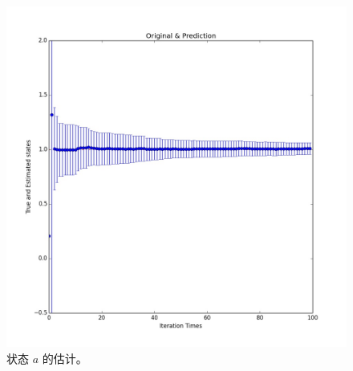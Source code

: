 \documentclass[UTF8]{ctexart}
\begin{document}
\begin{figure}
  \centering
  \includegraphics[width=0.9\columnwidth]{kalman}
   \caption{状态 $a$ 的估计。}
  \label{fig:state_a}  
\end{figure}
\end{document}

